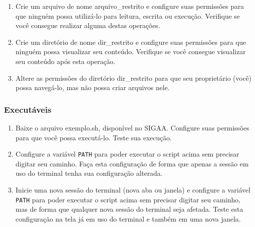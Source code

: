 \documentclass[a4paper,10pt,titlepage,twosided]{book}
\begin{document}
\begin{enumerate}
\medskip
\item Crie um arquivo de nome \textsf{arquivo\_restrito} e configure suas permissões para que ninguém possa utilizá-lo para leitura, escrita ou execução. Verifique se você consegue realizar alguma destas operações.
\item Crie um diretório de nome \textsf{dir\_restrito} e configure suas permissões para que ninguém possa visualizar seu conteúdo. Verifique se você consegue visualizar seu conteúdo após esta operação.
\item Altere as permissões do diretório \textsf{dir\_restrito} para que seu proprietário (você) possa navegá-lo, mas não possa criar arquivos nele.
\end{enumerate}

\subsubsection{Executáveis}

\begin{enumerate}
\item Baixe o arquivo \textsf{exemplo.sh}, disponível no SIGAA. Configure suas permissões para que você possa executá-lo. Teste sua execução.
\item Configure a variável \texttt{PATH} para poder executar o script acima sem precisar digitar seu caminho. Faça esta configuração de forma que apenas a sessão em uso do terminal tenha sua configuração alterada.
\item Inicie uma nova sessão do terminal (nova aba ou janela) e configure a variável \texttt{PATH} para poder executar o script acima sem precisar digitar seu caminho, mas de forma que qualquer nova sessão do terminal seja afetada. Teste esta configuração na tela já em uso do terminal e também em uma nova janela.
\end{enumerate}
\end{document}
